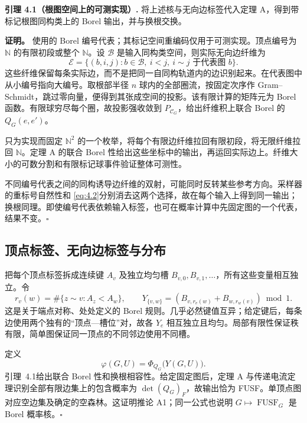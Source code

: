 \documentclass[UTF8,zihao=-4,a4paper]{ctexart}
\numberwithin{equation}{section}
\begin{document}
\textbf{引理 4.1（根图空间上的可测实现）.}
将上述核与无向边标签代入定理 A，得到带标记根图同构类上的 Borel 输出，并与换根交换。

\textbf{证明。}
使用\cite[\S2, p.~1461]{AL}的 Borel 编号代表；其标记空间重编码仅用于可测实现。顶点编号为 $\mathbb N$ 的有限初段或整个 $\mathbb N$。设 $\mathscr B$ 是输入同构类空间，则实际无向边纤维为
\begin{equation}\label{eq:4.3a}
 \mathscr E=\{(b,i,j):b\in\mathscr B,\ i<j,\ i\sim j\text{ 于代表图 }b\}.
\tag{4.3a}
\end{equation}
这些纤维保留每条实际边，而不是把同一自同构轨道内的边识别起来。在代表图中从小编号指向大编号。取根部半径 $n$ 球内的全部圈流，按固定次序作 Gram--Schmidt，跳过零向量，便得到其张成空间的投影。该有限计算的矩阵元为 Borel 函数。有限球穷尽每个圈，故投影强收敛到 $P_{\mathcal C_G}$，给出纤维积上联合 Borel 的 $Q_G(e,e')$。

只为实现而固定 $\mathbb N^2$ 的一个枚举，将每个有限边纤维拉回有限初段，将无限纤维拉回 $\mathbb N$。定理 A 的联合 Borel 性给出这些坐标中的输出，再运回实际边上。纤维大小的可数分割和有限标记球事件验证整体可测性。

不同编号代表之间的同构诱导边纤维的双射，可能同时反转某些参考方向。采样器的重标号自然性和 \eqref{eq:4.2}分别消去这两个选择，故在每个输入上得到同一输出；换根同理。即使编号代表依赖输入标签，也可在概率计算中先固定图的一个代表，结果不变。\hfill$\square$

\subsection{顶点标签、无向边标签与分布}

把每个顶点标签拆成连续键 $A_v$ 及独立均匀槽 $B_{v,0},B_{v,1},\ldots$，所有这些变量相互独立。令
\begin{equation}\label{eq:4.3}
 r_v(w)=\#\{z\sim v:A_z<A_w\},\qquad
 Y_{\{v,w\}}=(B_{v,r_v(w)}+B_{w,r_w(v)})\bmod1.
\tag{4.3}
\end{equation}
这是关于端点对称、处处定义的 Borel 规则。几乎必然键值互异；给定键后，每条边使用两个独有的“顶点---槽位”对，故各 $Y_e$ 相互独立且均匀。局部有限性保证秩有限，简单图保证同一顶点的不同邻边使用不同槽。

定义
\begin{equation}\label{eq:4.4}
 \varphi(G,U)=\Phi_{Q_G}\bigl(Y(G,U)\bigr).
\tag{4.4}
\end{equation}
引理~4.1给出联合 Borel 性和换根相容性。给定固定图后，定理 A 与传递电流定理识别全部有限边集上的包含概率为 $\det(Q_G)_F$，故输出恰为 FUSF。单顶点图对应空边集及确定的空森林。这证明推论 A1；同一公式也说明 $G\mapsto\operatorname{FUSF}_G$ 是 Borel 概率核。\hfill$\square$
\end{document}
